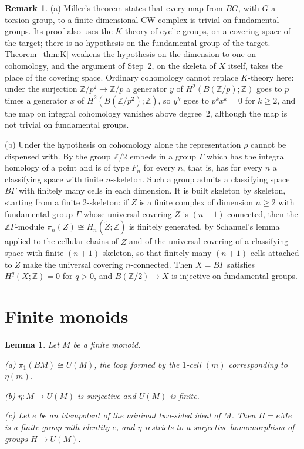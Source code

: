 \documentclass[11pt,a4paper]{article}
\newtheorem{lemma}[theorem]{Lemma}
\theoremstyle{definition}
\newtheorem{remark}[theorem]{Remark}
\newcommand{\Z}{\mathbb{Z}}
\begin{document}
\begin{remark}\label{rem:miller}
(a) Miller's theorem \cite[Theorem~B, p.~40; proved as Theorem~10.1,
pp.~84--85]{Mi} states that every map from $BG$, with $G$ a torsion group, to
a finite-dimensional CW complex is trivial on fundamental groups. Its proof
also uses the $K$-theory of cyclic groups, on a covering space of the target;
there is no hypothesis on the fundamental group of the target.
Theorem~\ref{thm:K} weakens the hypothesis on the dimension to one on
cohomology, and the argument of Step~2, on the skeleta of $X$ itself, takes
the place of the covering space. Ordinary cohomology cannot replace
$K$-theory here: under the surjection $\Z/p^2\to\Z/p$ a generator $y$ of
$H^2(B(\Z/p);\Z)$ goes to $p$ times a generator $x$ of $H^2(B(\Z/p^2);\Z)$,
so $y^k$ goes to $p^kx^k=0$ for $k\ge2$, and the map on integral cohomology
vanishes above degree~$2$, although the map is not trivial on fundamental
groups.

(b) Under the hypothesis on cohomology alone the representation $\rho$
cannot be dispensed with. By \cite[Theorem~A and the properties (1), (4)
recalled in the introduction]{PW} the group $\Z/2$ embeds in a group
$\Gamma$ which has the integral homology of a point and is of type $F_n$ for
every $n$, that is, has for every $n$ a classifying space with finite
$n$-skeleton. Such a group admits a classifying space $B\Gamma$ with finitely
many cells in each dimension. It is built skeleton by skeleton, starting
from a finite $2$-skeleton: if $Z$ is a finite complex of dimension $n\ge2$
with fundamental group $\Gamma$ whose universal covering $\widetilde Z$ is
$(n-1)$-connected, then the $\Z\Gamma$-module
$\pi_n(Z)\cong H_n(\widetilde Z;\Z)$ is finitely generated, by Schanuel's
lemma applied to the cellular chains of $\widetilde Z$ and of the universal
covering of a classifying space with finite $(n+1)$-skeleton, so that
finitely many $(n+1)$-cells attached to $Z$ make the universal covering
$n$-connected. Then $X=B\Gamma$ satisfies $H^q(X;\Z)=0$ for $q>0$, and $B(\Z/2)\to X$ is injective
on fundamental groups.
\end{remark}

\section{Finite monoids}\label{sec:monoids}

\begin{lemma}\label{lem:known}
Let $M$ be a finite monoid.

\textup{(a)} $\pi_1(BM)\cong U(M)$, the loop formed by the $1$-cell $(m)$
corresponding to $\eta(m)$.

\textup{(b)} $\eta\colon M\to U(M)$ is surjective and $U(M)$ is finite.

\textup{(c)} Let $e$ be an idempotent of the minimal two-sided ideal of $M$.
Then $H=eMe$ is a finite group with identity $e$, and $\eta$ restricts to a
surjective homomorphism of groups $H\to U(M)$.
\end{lemma}
\end{document}
